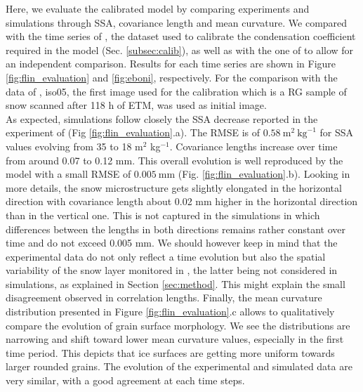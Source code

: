 \documentclass[draft,ms]{agujournal2019}
\begin{document}
 Here, we evaluate the calibrated model by comparing experiments and simulations through SSA, covariance length and mean curvature.
We compared with the time series of , the dataset used to calibrate the condensation coefficient required in the model (Sec. \ref{subsec:calib}), as well as with the one of  to allow for an independent comparison. Results for each time series are shown in Figure \ref{fig:flin_evaluation} and \ref{fig:eboni}, respectively. For the comparison with the data of , iso05, the first image used for the calibration which is a RG sample of snow scanned after 118 h of ETM, was used as initial image. \\

As expected, simulations follow closely the SSA decrease reported in the experiment of  (Fig \ref{fig:flin_evaluation}.a).
The RMSE is of $0.58\ \mathrm{m}^2\ \mathrm{kg}^{-1}$ for SSA values evolving from 35 to 18 m$^2$ kg$^{-1}$.
Covariance lengths increase over time from around 0.07 to 0.12 mm. This overall evolution is well reproduced by the model with a small RMSE of $0.005\ \mathrm{mm}$ (Fig. \ref{fig:flin_evaluation}.b). Looking in more details, the snow microstructure gets slightly elongated in the horizontal direction with covariance length about 0.02 mm higher in the horizontal direction than in the vertical one. This is not captured in the simulations in which differences between the lengths in both directions remains rather constant over time and do not exceed 0.005 mm. We should however keep in mind that the experimental data do not only reflect a time evolution but also the spatial variability of the snow layer monitored in , the latter being not considered in simulations, as explained in Section \ref{sec:method}. This might explain the small disagreement observed in correlation lengths.
Finally, the mean curvature distribution presented in Figure \ref{fig:flin_evaluation}.c allows to qualitatively compare the evolution of grain surface morphology. We see the distributions are narrowing and shift toward lower mean curvature values, especially in the first time period. This depicts that ice surfaces are getting more uniform towards larger rounded grains. The evolution of the experimental and simulated data are very similar, with a good agreement at each time steps.\\
\end{document}
